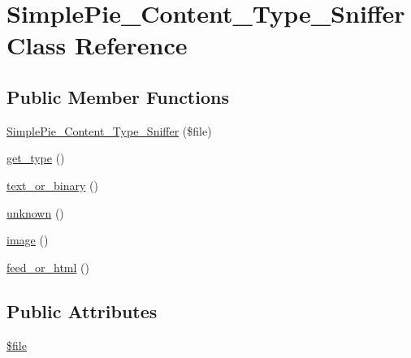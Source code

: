 \hypertarget{class_simple_pie___content___type___sniffer}{\section{Simple\-Pie\-\_\-\-Content\-\_\-\-Type\-\_\-\-Sniffer Class Reference}
\label{class_simple_pie___content___type___sniffer}
}
\subsection*{Public Member Functions}
\begin{DoxyCompactItemize}
\item 
\hyperlink{class_simple_pie___content___type___sniffer_aeb07adf0d7bd9e2392061998415359c3}{Simple\-Pie\-\_\-\-Content\-\_\-\-Type\-\_\-\-Sniffer} (\$file)
\item 
\hyperlink{class_simple_pie___content___type___sniffer_a8240c5e8332a67bd1d5fe7c173566e33}{get\-\_\-type} ()
\item 
\hyperlink{class_simple_pie___content___type___sniffer_a16e34298659725fbabcd18005dbec280}{text\-\_\-or\-\_\-binary} ()
\item 
\hyperlink{class_simple_pie___content___type___sniffer_a8faa3e19b0ec1230d8aba8188d9bdd0b}{unknown} ()
\item 
\hyperlink{class_simple_pie___content___type___sniffer_a20a06fa26cd96c5fbe24ec8693b06e0b}{image} ()
\item 
\hyperlink{class_simple_pie___content___type___sniffer_ad9aae8cdb28f210f280397f1105ef766}{feed\-\_\-or\-\_\-html} ()
\end{DoxyCompactItemize}
\subsection*{Public Attributes}
\begin{DoxyCompactItemize}
\item 
\hyperlink{class_simple_pie___content___type___sniffer_adada0467a56a89883af88107ea9a9147}{\$file}
\end{DoxyCompactItemize}



